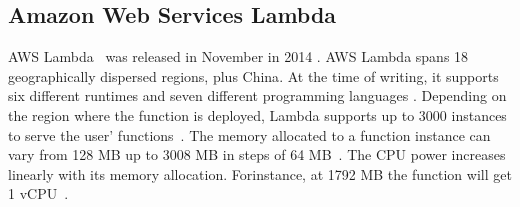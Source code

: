 %


\subsection{Amazon Web Services Lambda}

\gls{AWS} Lambda~\cite{AWSLambda} was released in November in 2014 \cite{AWSLambdaRelease}. 
\gls{AWS} Lambda spans 18 geographically dispersed regions, plus China\cite{AWSRegions}. 
At the time of writing, it supports six different runtimes and seven different programming languages \cite{AWSLambdaLanguages}. 
Depending on the region where the function is deployed, Lambda supports up to 3000 instances to serve the user' functions~\cite{AWSLambdaScaling}. 
The memory allocated to a function instance can vary from 128 \gls{MB} up to 3008 \gls{MB} in steps of 64 \gls{MB}~\cite{AWSLambdaConfig}. 
The \gls{CPU} power increases linearly with its memory allocation.
Forinstance, at 1792 \gls{MB} the function will get 1 \gls{vCPU}~\cite{AWSLambdaConfig}.

